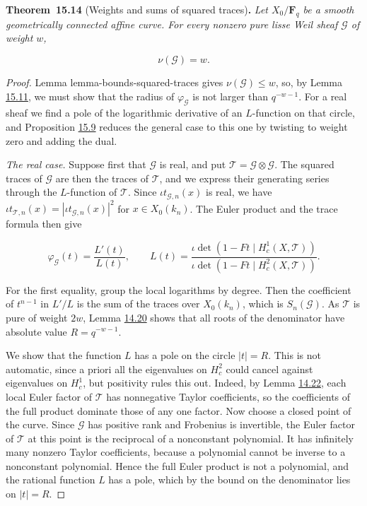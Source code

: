\documentclass[11pt]{article}
\newenvironment{bpstatement}[2]{\par\addvspace{0.6\baselineskip}\noindent\textbf{#1}#2\textbf{.}\enspace\ignorespaces}
  {\par\addvspace{0.4\baselineskip}}
\newenvironment{bpstatementit}[2]{\begin{bpstatement}{#1}{#2}\itshape\ignorespaces}{\end{bpstatement}}
\begin{document}
\label{bp162}%
\begin{bpstatementit}{Theorem~15.14}{ (Weights and sums of squared traces)}
Let \(X_0/\mathbf F_q\) be a smooth geometrically connected affine curve. For every nonzero pure lisse Weil sheaf \(\mathcal G\) of weight \(w\),

\[
\nu(\mathcal G)=w.
\]
\end{bpstatementit}

\begin{proof}[{Proof}]\label{bp163}%
Lemma lemma-bounds-squared-traces gives \(\nu(\mathcal G)\le w\), so, by Lemma \hyperref[bp153]{15.11}, we must show that the radius of \(\varphi_{\mathcal G}\) is not larger than \(q^{-w-1}\). For a real sheaf we find a pole of the logarithmic derivative of an \(L\)-function on that circle, and Proposition \hyperref[bp148]{15.9} reduces the general case to this one by twisting to weight zero and adding the dual.

\emph{The real case.} Suppose first that \(\mathcal G\) is real, and put \(\mathcal T=\mathcal G\otimes\mathcal G\). The squared traces of \(\mathcal G\) are then the traces of \(\mathcal T\), and we express their generating series through the \(L\)-function of \(\mathcal T\). Since \(\iota t_{\mathcal G,n}(x)\) is real, we have \(\iota t_{\mathcal T,n}(x)=|\iota t_{\mathcal G,n}(x)|^2\) for \(x\in X_0(k_n)\). The Euler product and the trace formula then give

\[
\varphi_{\mathcal G}(t)=\frac{L'(t)}{L(t)},\qquad
L(t)=\frac{\iota\det(1-Ft\mid H_c^1(X,\mathcal T))}
{\iota\det(1-Ft\mid H_c^2(X,\mathcal T))}.
\]

For the first equality, group the local logarithms by degree. Then the coefficient of \(t^{n-1}\) in \(L'/L\) is the sum of the traces over \(X_0(k_n)\), which is \(S_n(\mathcal G)\). As \(\mathcal T\) is pure of weight \(2w\), Lemma \hyperref[bp104]{14.20} shows that all roots of the denominator have absolute value \(R=q^{-w-1}\).

We show that the function \(L\) has a pole on the circle \(|t|=R\). This is not automatic, since a priori all the eigenvalues on \(H^2_c\) could cancel against eigenvalues on \(H^1_c\), but positivity rules this out. Indeed, by Lemma \hyperref[bp109]{14.22}, each local Euler factor of \(\mathcal T\) has nonnegative Taylor coefficients, so the coefficients of the full product dominate those of any one factor. Now choose a closed point of the curve. Since \(\mathcal G\) has positive rank and Frobenius is invertible, the Euler factor of \(\mathcal T\) at this point is the reciprocal of a nonconstant polynomial. It has infinitely many nonzero Taylor coefficients, because a polynomial cannot be inverse to a nonconstant polynomial. Hence the full Euler product is not a polynomial, and the rational function \(L\) has a pole, which by the bound on the denominator lies on \(|t|=R\).


\end{proof}
\end{document}
